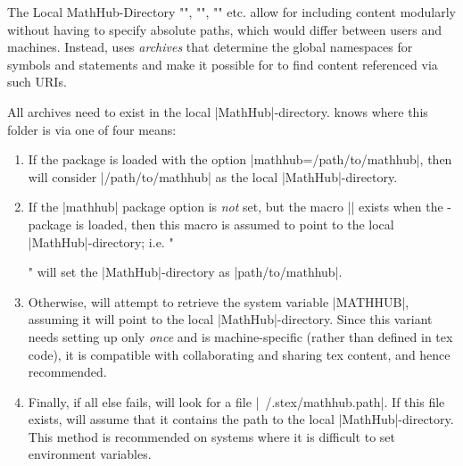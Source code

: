\begin{sfragment}{The Local MathHub-Directory}
    \stexcode"\usemodule", \stexcode"\importmodule", 
    \stexcode"" etc. allow for 
    including content modularly without having to specify absolute
    paths, which would differ between users and machines. Instead,
    \sTeX uses \emph{archives} that determine the global
    namespaces for symbols and statements and make it possible
    for \sTeX to find content referenced via such URIs.

    All \sTeX archives need to exist in the local |MathHub|-directory.
    \sTeX knows where this folder is via one of four means:

    \begin{enumerate}
    \item If the \sTeX package is loaded with the option |mathhub=/path/to/mathhub|, then
      \sTeX will consider |/path/to/mathhub| as the local |MathHub|-directory.
    \item If the |mathhub| package option is \emph{not} set, but the macro |\mathhub|
      exists when the \sTeX-package is loaded, then this macro is assumed to point to the
      local |MathHub|-directory; i.e.
      \stexcode"\def\mathhub{/path/to/mathhub}\usepackage{stex}" will set the
      |MathHub|-directory as |path/to/mathhub|.
    \item Otherwise, \sTeX will attempt to retrieve the system variable |MATHHUB|,
      assuming it will point to the local |MathHub|-directory. Since this variant needs
      setting up only \emph{once} and is machine-specific (rather than defined in tex
      code), it is compatible with collaborating and sharing tex content, and hence
      recommended.
    \item Finally, if all else fails, \sTeX will look for a file
      |~/.stex/mathhub.path|. If this file exists, \sTeX will assume that it contains the
      path to the local |MathHub|-directory. This method is recommended on systems where
      it is difficult to set environment variables.
    \end{enumerate}
\end{sfragment}

